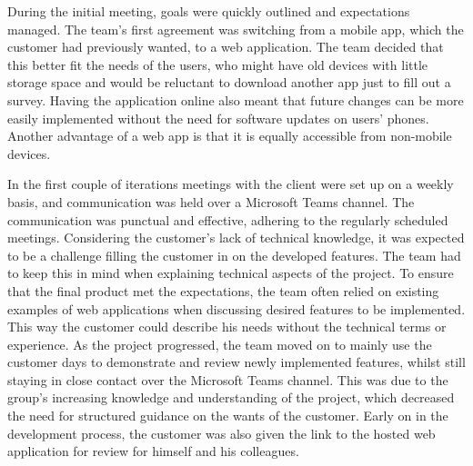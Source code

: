 \documentclass{l3proj}
\begin{document}
During the initial meeting, goals were quickly outlined and expectations managed. The team's first agreement was switching from a mobile app, which the customer had previously wanted, to a web application. The team decided that this better fit the needs of the users, who might have old devices with little storage space and would be reluctant to download another app just to fill out a survey. Having the application online also meant that future changes can be more easily implemented without the need for software updates on users' phones. Another advantage of a web app is that it is equally accessible from non-mobile devices.

In the first couple of iterations meetings with the client were set up on a weekly basis, and communication was held over a Microsoft Teams channel. The communication was punctual and effective, adhering to the regularly scheduled meetings. Considering the customer's lack of technical knowledge, it was expected to be a challenge filling the customer in on the developed features. The team had to keep this in mind when explaining technical aspects of the project. To ensure that the final product met the expectations, the team often relied on existing examples of web applications when discussing desired features to be implemented. This way the customer could describe his needs without the technical terms or experience. As the project progressed, the team moved on to mainly use the customer days to demonstrate and review newly implemented features, whilst still staying in close contact over the Microsoft Teams channel. This was due to the group's increasing knowledge and understanding of the project, which decreased the need for structured guidance on the wants of the customer. Early on in the development process, the customer was also given the link to the hosted web application for review for himself and his colleagues.
\end{document}
